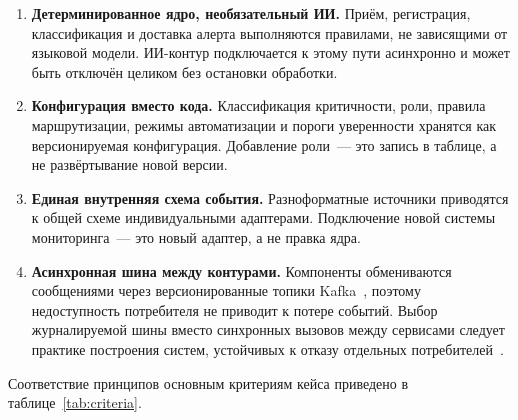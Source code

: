 \documentclass[utf8x, 12pt]{G7-32} %
\begin{document}
\begin{enumerate}[1.]
    \item \textbf{Детерминированное ядро, необязательный ИИ.}
          Приём, регистрация, классификация и доставка алерта выполняются
          правилами, не зависящими от языковой модели. ИИ-контур подключается
          к этому пути асинхронно и может быть отключён целиком без остановки
          обработки.
    \item \textbf{Конфигурация вместо кода.}
          Классификация критичности, роли, правила маршрутизации, режимы
          автоматизации и пороги уверенности хранятся как версионируемая
          конфигурация. Добавление роли~--- это запись в таблице, а не
          развёртывание новой версии.
    \item \textbf{Единая внутренняя схема события.}
          Разноформатные источники приводятся к общей схеме индивидуальными
          адаптерами. Подключение новой системы мониторинга~--- это новый
          адаптер, а не правка ядра.
    \item \textbf{Асинхронная шина между контурами.}
          Компоненты обмениваются сообщениями через версионированные топики
          Kafka~\cite{kafka}, поэтому недоступность потребителя не приводит к
          потере событий. Выбор журналируемой шины вместо синхронных вызовов
          между сервисами следует практике построения систем, устойчивых к
          отказу отдельных потребителей~\cite{kleppmann2017}.
\end{enumerate}

Соответствие принципов основным критериям кейса приведено
в таблице~\ref{tab:criteria}.
\end{document}

